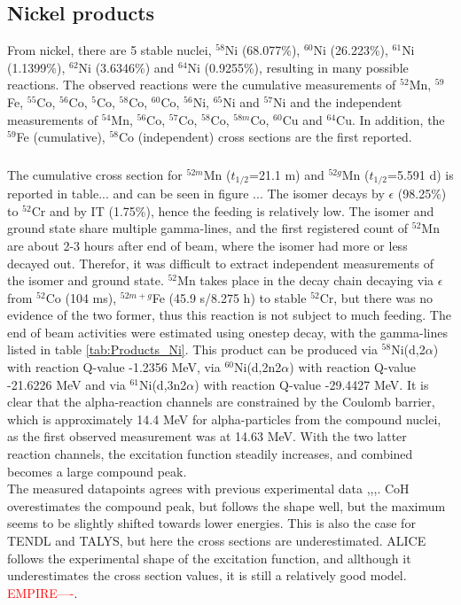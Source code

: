 \subsection{Nickel products}
From nickel, there are 5 stable nuclei, $^{58}$Ni (68.077\%), $^{60}$Ni (26.223\%), $^{61}$Ni (1.1399\%), $^{62}$Ni (3.6346\%) and $^{64}$Ni (0.9255\%), resulting in many possible reactions. The observed reactions were the cumulative measurements of $^{52}$Mn, $^{59}$Fe, $^{55}$Co, $^{56}$Co, $^{5}$Co, $^{58}$Co, $^{60}$Co, $^{56}$Ni, $^{65}$Ni and $^{57}$Ni and the independent measurements of $^{54}$Mn, $^{56}$Co, $^{57}$Co, $^{58}$Co, $^{58m}$Co, $^{60}$Cu and $^{64}$Cu. In addition, the $^{59}$Fe (cumulative), $^{58}$Co (independent) cross sections are the first reported.\\





\subsubsection{}
The cumulative cross section for $^{52m}$Mn ($t_{1/2}$=21.1 m) and $^{52g}$Mn ($t_{1/2}$=5.591 d) \cite{Dong2015} is reported in table... and can be seen in figure ... The isomer decays by $\epsilon$ (98.25\%) to $^{52}$Cr and by IT (1.75\%), hence the feeding is relatively low. The isomer and ground state share multiple gamma-lines, and the first registered count of $^{52}$Mn are about 2-3 hours after end of beam, where the isomer had more or less decayed out. Therefor, it was difficult to extract independent measurements of the isomer and ground state. $^{52}$Mn takes place in the decay chain decaying via $\epsilon$ from $^{52}$Co (104 ms), $^{52m+g}$Fe (45.9 s/8.275 h) to stable $^{52}$Cr, but there was no evidence of the two former, thus this reaction is not subject to much feeding. The end of beam activities were estimated using onestep decay, with the gamma-lines listed in table \ref{tab:Products_Ni}. This product can be produced via  $^{58}$Ni(d,2$\alpha$) with reaction Q-value -1.2356 MeV, via $^{60}$Ni(d,2n2$\alpha$) with reaction Q-value -21.6226  MeV and via $^{61}$Ni(d,3n2$\alpha$) with reaction Q-value -29.4427 MeV. It is clear that the alpha-reaction channels are constrained by the Coulomb barrier, which is approximately 14.4 MeV for alpha-particles from the compound nuclei, as the first observed measurement was at 14.63 MeV. With the two latter reaction channels, the excitation function steadily increases, and combined becomes a large compound peak. \\
\noindent 
The measured datapoints agrees with previous experimental data \cite{Hermanne2013},\cite{Takacs2007},\cite{Usman2016},\cite{Amjed2013}. CoH overestimates the compound peak, but follows the shape well, but the maximum seems to be slightly shifted towards lower energies. This is also the case for TENDL and TALYS, but here the cross sections are underestimated. ALICE follows the experimental shape of the excitation function, and allthough it underestimates the cross section values, it is still a relatively good model. \textcolor{red}{EMPIRE----}. 


